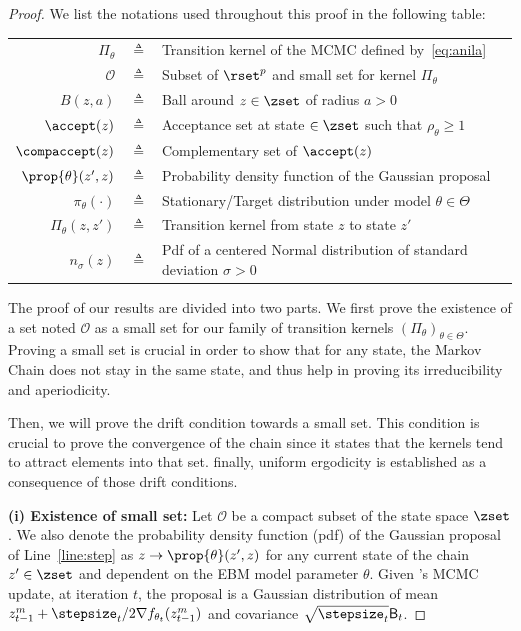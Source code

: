 \documentclass[letterpaper]{article} %
\begin{document}
\begin{proof}



We list the notations used throughout this proof in the following table:

\begin{table}[htbp]
\begin{tabular}{r c p{17cm} }
\toprule
$\Pi_\theta$ & $\triangleq$ &  Transition kernel of the MCMC defined by~\eqref{eq:anila}\\
$\mathcal{O}$ & $\triangleq$ & Subset of $\rset^p$ and small set for kernel $\Pi_\theta$\\
$B(z,a)$  & $\triangleq$ & Ball around $z \in \zset$ of radius $a >0$\\
$\accept(z)$ & $\triangleq$ & Acceptance set at state $ \in \zset$ such that $\rho_\theta \geq 1$ \\
$\compaccept(z)$ & $\triangleq$ & Complementary set of  $\accept(z)$\\
$\prop{\theta}(z',z)$ & $\triangleq$ &  Probability density function of the Gaussian proposal\\
$\pi_{\theta}(\cdot)$ & $\triangleq$ &  Stationary/Target distribution under model $\theta \in \Theta$\\
$\Pi_\theta(z, z')$ & $\triangleq$ & Transition kernel from state $z$ to state $z'$\\
$n_{\sigma}(z)$ & $\triangleq$ & Pdf of a centered Normal distribution of standard deviation $\sigma >0$ \\
\bottomrule
\end{tabular}
\label{tab:notations}
\end{table}

The proof of our results are divided into two parts.
We first prove the existence of a set noted $\mathcal{O}$ as a small set for our family of transition kernels $(\Pi_\theta)_{\theta \in \Theta}$.
Proving a small set is crucial in order to show that for any state, the Markov Chain does not stay in the same state, and thus help in proving its irreducibility and aperiodicity.

Then, we will prove the drift condition towards a small set.
This condition is crucial to prove the convergence of the chain since it states that the kernels tend to attract elements into that set. 
finally, uniform ergodicity is established as a consequence of those drift conditions.

\medskip
\noindent \textbf{(i) Existence of small set: }
Let $\mathcal{O}$ be a compact subset of the state space $\zset$.
We also denote the probability density function (pdf) of the Gaussian proposal of Line~\ref{line:step} as $z \to \prop{\theta}(z',z)$ for any current state of the chain $z' \in \zset$ and dependent on the EBM model parameter $\theta$.
Given \algo's MCMC update, at iteration $t$, the proposal is a Gaussian distribution of mean $z_{t-1}^m+ \stepsize_t/2  \nabla f_{\theta_t}(z_{t-1}^m)$ and covariance $\sqrt{\stepsize_t} \mathsf{B}_t$.


\end{proof}
\end{document}
